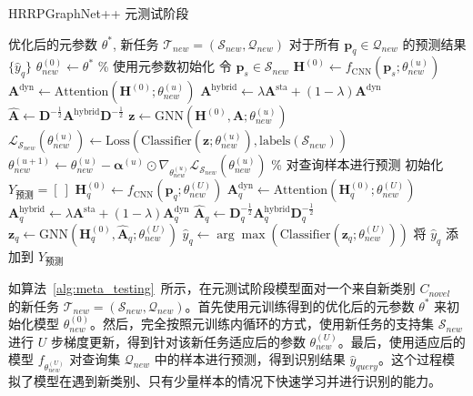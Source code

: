 \begin{algorithm}[htbp]
\caption{HRRPGraphNet++ 元测试阶段}
\label{alg:meta_testing}
\begin{algorithmic}[1]
    \REQUIRE 优化后的元参数 $\theta^*$, 新任务 $\mathcal{T}_{new} = (\mathcal{S}_{new}, \mathcal{Q}_{new})$
    \ENSURE 对于所有 $\mathbf{p}_q \in \mathcal{Q}_{new}$ 的预测结果 $\{\hat{y}_q\}$
    \STATE $\theta_{new}^{(0)} \leftarrow \theta^*$ \% 使用元参数初始化
        \STATE 令 $\mathbf{p}_s \in \mathcal{S}_{new}$
        \STATE $\mathbf{H}^{(0)} \leftarrow f_{\text{CNN}}(\mathbf{p}_s; \theta_{new}^{(u)})$
        \STATE $\mathbf{A}^{\text{dyn}} \leftarrow \text{Attention}(\mathbf{H}^{(0)}; \theta_{new}^{(u)})$
        \STATE $\mathbf{A}^{\text{hybrid}} \leftarrow \lambda \mathbf{A}^{\text{sta}} + (1-\lambda) \mathbf{A}^{\text{dyn}}$
        \STATE $\hat{\mathbf{A}} \leftarrow \mathbf{D}^{-\frac{1}{2}} \mathbf{A}^{\text{hybrid}} \mathbf{D}^{-\frac{1}{2}}$
        \STATE $\mathbf{z} \leftarrow \text{GNN}(\mathbf{H}^{(0)}, \hat{\mathbf{A}}; \theta_{new}^{(u)})$
        \STATE $\mathcal{L}_{\mathcal{S}_{new}}(\theta_{new}^{(u)}) \leftarrow \text{Loss}( \text{Classifier}(\mathbf{z}; \theta_{new}^{(u)}), \text{labels}(\mathcal{S}_{new}) )$
        \STATE $\theta_{new}^{(u+1)} \leftarrow \theta_{new}^{(u)} - \boldsymbol{\alpha}^{(u)} \odot \nabla_{\theta_{new}^{(u)}} \mathcal{L}_{\mathcal{S}_{new}}(\theta_{new}^{(u)})$ 
    \ENDFOR 
    \STATE \% 对查询样本进行预测
    \STATE 初始化 $Y_{预测} = [~]$
        \STATE $\mathbf{H}_q^{(0)} \leftarrow f_{\text{CNN}}(\mathbf{p}_q; \theta_{new}^{(U)})$
        \STATE $\mathbf{A}_q^{\text{dyn}} \leftarrow \text{Attention}(\mathbf{H}_q^{(0)}; \theta_{new}^{(U)})$
        \STATE $\mathbf{A}_q^{\text{hybrid}} \leftarrow \lambda \mathbf{A}^{\text{sta}} + (1-\lambda) \mathbf{A}_q^{\text{dyn}}$
        \STATE $\hat{\mathbf{A}}_q \leftarrow \mathbf{D}_q^{-\frac{1}{2}} \mathbf{A}_q^{\text{hybrid}} \mathbf{D}_q^{-\frac{1}{2}}$
        \STATE $\mathbf{z}_q \leftarrow \text{GNN}(\mathbf{H}_q^{(0)}, \hat{\mathbf{A}}_q; \theta_{new}^{(U)})$
        \STATE $\hat{y}_q \leftarrow \arg\max (\text{Classifier}(\mathbf{z}_q; \theta_{new}^{(U)}))$
        \STATE 将 $\hat{y}_q$ 添加到 $Y_{预测}$
    \ENDFOR 
\end{algorithmic}
\end{algorithm}
如算法~\ref{alg:meta_testing}~所示，在元测试阶段模型面对一个来自新类别 $C_{novel}$ 的新任务 $\mathcal{T}_{new} = (\mathcal{S}_{new}, \mathcal{Q}_{new})$。首先使用元训练得到的优化后的元参数 $\theta^*$ 来初始化模型 $\theta_{new}^{(0)}$。然后，完全按照元训练内循环的方式，使用新任务的支持集 $\mathcal{S}_{new}$ 进行 $U$ 步梯度更新，得到针对该新任务适应后的参数 $\theta_{new}^{(U)}$。最后，使用适应后的模型 $f_{\theta_{new}^{(U)}}$ 对查询集 $\mathcal{Q}_{new}$ 中的样本进行预测，得到识别结果 $\hat{y}_{query}$。这个过程模拟了模型在遇到新类别、只有少量样本的情况下快速学习并进行识别的能力。

